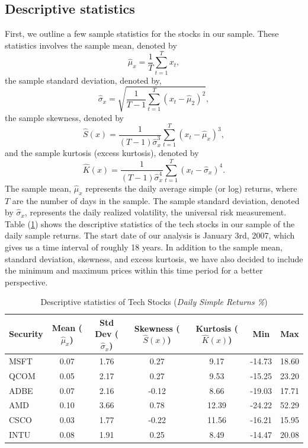 \documentclass[12pt]{article}
\begin{document}
\subsection{Descriptive statistics}
First, we outline a few sample statistics for the stocks in our sample. These statistics involves the sample mean, denoted by
\begin{equation}
	\hat{\mu}_x=\frac{1}{T}\sum_{t=1}^{T}x_t,
\end{equation}
the sample standard deviation, denoted by,
\begin{equation}
	\hat{\sigma}_x=\sqrt{\frac{1}{T-1}\sum_{t=1}^{T}\left(x_t-\hat{\mu}_2\right)^2},
\end{equation}
the sample skewness, denoted by
\begin{equation}
	\hat{S}(x)=\frac{1}{\left(T-1\right)\hat{\sigma}^3_x}\sum_{t=1}^{T}\left(x_t-\hat{\mu}_x\right)^3,
\end{equation}
and the sample kurtosis (excess kurtosis), denoted by
\begin{equation}
	\hat{K}(x)=\frac{1}{\left(T-1\right)\hat{\sigma}^4_x}\sum_{t=1}^{T}\left(x_t-\hat{\sigma}_x\right)^4.
\end{equation}
The sample mean, $\hat{\mu}_x$ represents the daily average simple (or log) returns, where $T$ are the number of days in the sample. The sample standard deviation, denoted by $\hat{\sigma}_x$, represents the daily realized volatility, the universal risk measurement. Table (\ref{tab:descriptive}) shows the descriptive statistics of the tech stocks in our sample of the daily sample returns. The start date of our analysis is January 3rd, 2007, which gives us a time interval of roughly 18 years. In addition to the sample mean, standard deviation, skewness, and excess kurtosis, we have also decided to include the minimum and maximum prices within this time period for a better perspective.
\begin{table}[ht]
	\centering
	\caption{Descriptive statistics of Tech Stocks (\textit{Daily Simple Returns \%})}
	\begin{tabular}[t]{lcccccc}
		\toprule
		Security & Mean ($\hat{\mu}_x$) & Std Dev ($\hat{\sigma}_x$) & Skewness ($\hat{S}(x)$) & Kurtosis ($\hat{K}(x)$) &Min&Max \\
		\midrule
		MSFT & 0.07 & 1.76 & 0.27 & 9.17&-14.73&18.60  \\
		QCOM & 0.05 & 2.17 & 0.27 & 9.53 &-15.25&23.20 \\
		ADBE & 0.07	& 2.16 &-0.12 & 8.66 & -19.03 & 17.71 \\	   
		AMD  & 0.10 & 3.66 & 0.78 & 12.39&-24.22&52.29 \\				   
		CSCO  & 0.03 & 1.77 & -0.22 & 11.56 &-16.21&15.95 \\		
		INTU  & 0.08 & 1.91 & 0.25 & 8.49&-14.47&20.08 \\
		\bottomrule
	\end{tabular}\label{tab:descriptive}
\end{table}
\end{document}

